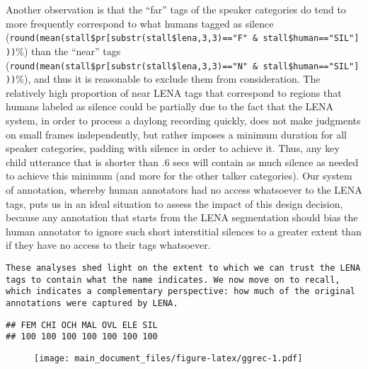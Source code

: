 \documentclass[english,floatsintext,man]{apa6}
\begin{document}
Another observation is that the \enquote{far} tags of the speaker
categories do tend to more frequently correspond to what humans tagged
as silence
(\texttt{round(mean(stall\$pr{[}substr(stall\$lena,3,3)=="F"\ \&\ stall\$human=="SIL"{]}))}\%)
than the \enquote{near} tags
(\texttt{round(mean(stall\$pr{[}substr(stall\$lena,3,3)=="N"\ \&\ stall\$human=="SIL"{]}))}\%),
and thus it is reasonable to exclude them from consideration. The
relatively high proportion of near LENA tags that correspond to regions
that humans labeled as silence could be partially due to the fact that
the LENA system, in order to process a daylong recording quickly, does
not make judgments on small frames independently, but rather imposes a
minimum duration for all speaker categories, padding with silence in
order to achieve it. Thus, any key child utterance that is shorter than
.6 secs will contain as much silence as needed to achieve this minimum
(and more for the other talker categories). Our system of annotation,
whereby human annotators had no access whatsoever to the LENA tags, puts
us in an ideal situation to assess the impact of this design decision,
because any annotation that starts from the LENA segmentation should
bias the human annotator to ignore such short interstitial silences to a
greater extent than if they have no access to their tags whatsoever.

\begin{verbatim}
These analyses shed light on the extent to which we can trust the LENA tags to contain what the name indicates. We now move on to recall, which indicates a complementary perspective: how much of the original annotations were captured by LENA.
\end{verbatim}

\begin{verbatim}
## FEM CHI OCH MAL OVL ELE SIL 
## 100 100 100 100 100 100 100
\end{verbatim}

\begin{figure}
\centering
\texttt{[image: main\_document\_files/figure-latex/ggrec-1.pdf]}
\caption{}
\end{figure}
\end{document}
